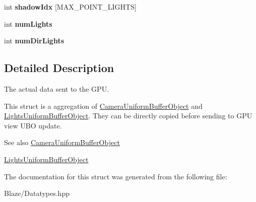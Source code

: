 \begin{DoxyCompactItemize}
int {\bfseries shadow\+Idx} \mbox{[}M\+A\+X\+\_\+\+P\+O\+I\+N\+T\+\_\+\+L\+I\+G\+H\+TS\mbox{]}
\item 
\mbox{\label{structblaze_1_1RendererUniformBufferObject_a8b030be21bd19e5391e6244c4f79c117}} 
int {\bfseries num\+Lights}
\item 
\mbox{\label{structblaze_1_1RendererUniformBufferObject_a8c2e99201439b70840256052576371fa}} 
int {\bfseries num\+Dir\+Lights}
\end{DoxyCompactItemize}


\subsection{Detailed Description}
The actual data sent to the G\+PU. 

This struct is a aggregation of \hyperlink{structblaze_1_1CameraUniformBufferObject}{Camera\+Uniform\+Buffer\+Object} and \hyperlink{structblaze_1_1LightsUniformBufferObject}{Lights\+Uniform\+Buffer\+Object}. They can be directly copied before sending to G\+PU view U\+BO update.

\begin{DoxySeeAlso}{See also}
\hyperlink{structblaze_1_1CameraUniformBufferObject}{Camera\+Uniform\+Buffer\+Object} 

\hyperlink{structblaze_1_1LightsUniformBufferObject}{Lights\+Uniform\+Buffer\+Object} 
\end{DoxySeeAlso}


The documentation for this struct was generated from the following file\+:\begin{DoxyCompactItemize}
\item 
Blaze/Datatypes.\+hpp\end{DoxyCompactItemize}
